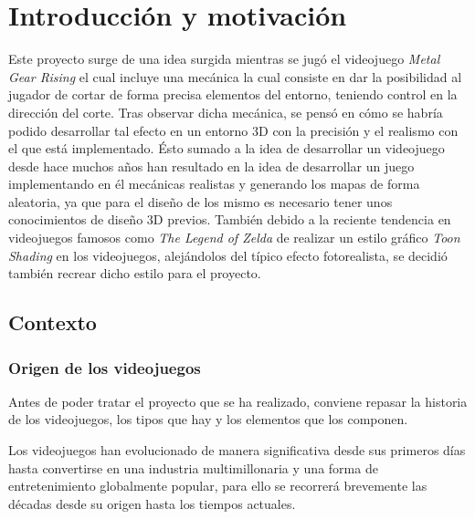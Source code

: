 \chapter{Introducción y motivación}

Este proyecto surge de una idea surgida mientras se jugó el videojuego \textit{Metal Gear Rising} el cual incluye una mecánica la cual consiste en dar la posibilidad al jugador de cortar de forma precisa elementos del entorno, teniendo control en la dirección del corte. Tras observar dicha mecánica, se pensó en cómo se habría podido desarrollar tal efecto en un entorno 3D con la precisión y el realismo con el que está implementado. Ésto sumado a la idea de desarrollar un videojuego desde hace muchos años han resultado en la idea de desarrollar un juego implementando en él mecánicas realistas y generando los mapas de forma aleatoria, ya que para el diseño de los mismo es necesario tener unos conocimientos de diseño 3D previos. También debido a la reciente tendencia en videojuegos famosos como \textit{The Legend of Zelda} de realizar un estilo gráfico \textit{Toon Shading} en los videojuegos, alejándolos del típico efecto fotorealista, se decidió también recrear dicho estilo para el proyecto. 

\section{Contexto}

\subsection{Origen de los videojuegos}

Antes de poder tratar el proyecto que se ha realizado, conviene repasar la historia de los videojuegos, los tipos que hay y los elementos que los componen.

Los videojuegos han evolucionado de manera significativa desde sus primeros días hasta convertirse en una industria multimillonaria y una forma de entretenimiento globalmente popular, para ello se recorrerá brevemente las décadas desde su origen hasta los tiempos actuales.

